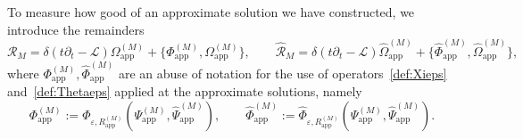 \documentclass[11pt,reqno,a4paper]{amsart}
\def\eps{\varepsilon}
\def\de{{\partial}}
\newcommand{\cL}{\mathcal{L}}
\newcommand{\cR}{\mathcal{R}}
\newcommand{\1}{\mathbbm{1}}
\theoremstyle{definition}
\theoremstyle{definition}
\numberwithin{equation}{section}
\newcommand{\Mapp}[2]{#1^{(#2)}_\mathrm{app}}
\begin{document}
To measure how good of an approximate solution we have constructed, we introduce the remainders
\begin{equation}
\label{def:RM}
    \cR_{M}=\delta(t\de_t-\cL)\Mapp{\Omega}{M}+\{\Mapp{\Phi}{M},\Mapp{\Omega}{M}\}, \qquad \widehat{\cR}_{M}=\delta(t\de_t-\cL)\Mapp{\widehat{\Omega}}{M}+\{\Mapp{\widehat{\Phi}}{M},\Mapp{\widehat{\Omega}}{M}\},
\end{equation}   
where $\Mapp{\Phi}{M},\Mapp{\widehat{\Phi}}{M}$ are an abuse of notation for the use of operators~\cref{def:Xieps} and~\cref{def:Thetaeps} applied at the approximate solutions, namely
\begin{equation}\label{def:Phiapp}
    \Mapp{\Phi}{M} := \Phi_{\eps,\Mapp{R}{M}} (\Mapp{\Psi}{M},\Mapp{\widehat{\Psi}}{M}), \qquad \Mapp{\widehat{\Phi}}{M} := \widehat{\Phi}_{\eps,\Mapp{R}{M}} (\Mapp{\Psi}{M},\Mapp{\widehat{\Psi}}{M}).
\end{equation}
\end{document}
